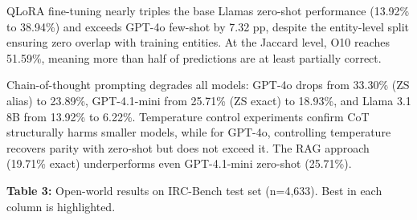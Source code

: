 \documentclass[
]{article}
\begin{document}
QLoRA fine-tuning nearly triples the base Llama\textquotesingle s
zero-shot performance (13.92\% to 38.94\%) and exceeds GPT-4o few-shot
by 7.32 pp, despite the entity-level split ensuring zero overlap with
training entities. At the Jaccard level, O10 reaches 51.59\%, meaning
more than half of predictions are at least partially correct.

Chain-of-thought prompting degrades all models: GPT-4o drops from
33.30\% (ZS alias) to 23.89\%, GPT-4.1-mini from 25.71\% (ZS exact) to
18.93\%, and Llama 3.1 8B from 13.92\% to 6.22\%. Temperature control
experiments confirm CoT structurally harms smaller models, while for
GPT-4o, controlling temperature recovers parity with zero-shot but does
not exceed it. The RAG approach (19.71\% exact) underperforms even
GPT-4.1-mini zero-shot (25.71\%).

\textbf{Table 3:} Open-world results on IRC-Bench test set (n=4,633).
Best in each column is highlighted.
\end{document}
